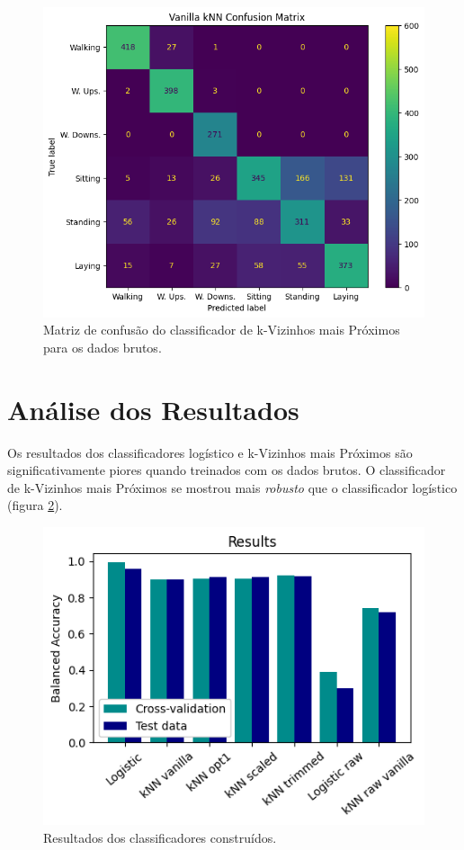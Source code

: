 \documentclass[final,5p]{elsarticle}
\numberwithin{equation}{section}
\begin{document}
        \begin{figure}[hbt!]
            \includegraphics[width=0.95\columnwidth]{B_kNN_Vanilla_CM.png}
            \caption{Matriz de confusão do classificador de k-Vizinhos mais Próximos para os dados brutos.}
            \label{fig:cm_knn_vanilla_brutos}
        \end{figure}

\section{Análise dos Resultados}

        Os resultados dos classificadores logístico e k-Vizinhos mais Próximos são significativamente piores quando treinados com os dados brutos. O classificador de k-Vizinhos mais Próximos se mostrou mais \emph{robusto} que o classificador logístico (figura \ref{fig:resultados}).

        \begin{figure}[hbt!]
            \includegraphics[width=0.95\columnwidth]{C_Results.png}
            \caption{Resultados dos classificadores construídos.}
            \label{fig:resultados}
        \end{figure}
\end{document}
